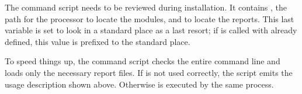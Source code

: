 The  command script needs to be reviewed during installation. It
contains , the path for the  processor to locate
the modules, and  to locate the reports. This last variable is
set to look in a standard place as a last resort; if  is called
with  already defined, this value is prefixed to the standard
place.

To speed things up, the command script checks the entire command line and
loads only the necessary report files. If  is not used correctly,
the script emits the usage description shown above. Otherwise  is
executed by the same process.


